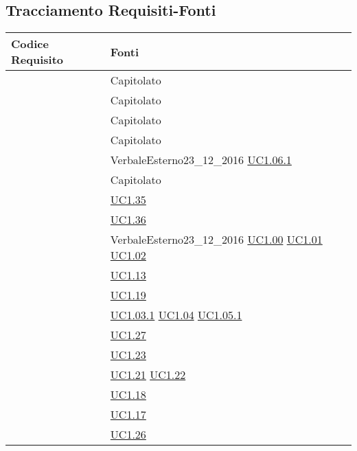 \subsection{Tracciamento Requisiti-Fonti}

\begin{longtable}{|P{6cm}|P{6cm}|}
	\hline \textbf{Codice Requisito} & \textbf{Fonti}\\
	\hline {} & Capitolato \\
	\hline {} & Capitolato \\
	\hline {} & Capitolato \\
	\hline {} & Capitolato \\
	\hline {} & VerbaleEsterno23\_12\_2016 \linebreak \hyperref[UC1.06.1]{UC1.06.1}  \\	
	\hline {} & Capitolato \\
	\hline {} & \hyperref[UC1.35]{UC1.35} \\
	\hline {} & \hyperref[UC1.36]{UC1.36} \\
	\hline {} & VerbaleEsterno23\_12\_2016 \linebreak \hyperref[UC1.00]{UC1.00} \linebreak \hyperref[UC1.01]{UC1.01} \linebreak \hyperref[UC1.02]{UC1.02} \\
	\hline {} & \hyperref[UC1.13]{UC1.13} \\
	\hline {} & \hyperref[UC1.19]{UC1.19} \\
	\hline {} & \hyperref[UC1.03.1]{UC1.03.1} \linebreak \hyperref[UC1.04]{UC1.04} \linebreak \hyperref[UC1.05.1]{UC1.05.1} \\
	\hline {} & \hyperref[UC1.27]{UC1.27} \\
	\hline {} & \hyperref[UC1.23]{UC1.23} \\
	\hline {} & \hyperref[UC1.21]{UC1.21} \linebreak \hyperref[UC1.22]{UC1.22} \\
	\hline {} & \hyperref[UC1.18]{UC1.18} \\
	\hline {} & \hyperref[UC1.17]{UC1.17} \\
	\hline {} & \hyperref[UC1.26]{UC1.26} \\

\end{longtable}
